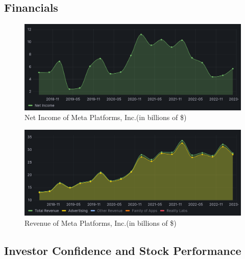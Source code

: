 \documentclass[12pt, a4paper]{article}
\begin{document}
\subsection*{Financials}

\begin{figure}[H]
    \centering
    \includegraphics[width=1.00\textwidth]{net-income}
    \caption{Net Income of Meta Platforms, Inc.(in billions of
    \$)\cite{2023q1,2020q4,2020q3,2020q2,2020q1,2019q4,2019q3,2019q2,2019q1,2018q4,2018q3,2018q2}}
    \label{fig:net-income}
\end{figure}

\begin{figure}[H]
    \centering
    \includegraphics[width=1.00\textwidth]{revenue}
    \caption{Revenue of Meta Platforms, Inc.(in billions of
    \$)\cite{2023q1,2020q4,2020q3,2020q2,2020q1,2019q4,2019q3,2019q2,2019q1,2018q4,2018q3,2018q2}}
    \label{fig:revenue}
\end{figure}

\subsection*{Investor Confidence and Stock Performance}

\end{document}
